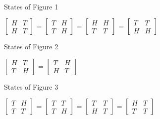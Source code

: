 \documentclass{article}
\begin{document}
\\
\begin{center}
States of Figure 1
\end{center}
\begin{center}
$\begin{bmatrix}
        H & T \\
        H & T 
    \end{bmatrix}$
        = 
    $\begin{bmatrix}
        T & H \\
        T & H 
    \end{bmatrix}$
       =
    $\begin{bmatrix}
        H & H \\
        T & T 
    \end{bmatrix}$
        =
    $\begin{bmatrix}
        T & T \\
        H & H 
    \end{bmatrix}$
\end{center}
\begin{center}
States of Figure 2
\end{center}
\begin{center}
$\begin{bmatrix} 
        H & T \\
        T & H
        \end{bmatrix}$
        =
        $\begin{bmatrix}
        T & H \\
        H & T 
        \end{bmatrix}$
\end{center}
\begin{center}
States of Figure 3
\end{center}
\begin{center}
$\begin{bmatrix} 
        T & H \\
        T & T
        \end{bmatrix}$
        =
        $\begin{bmatrix}
        T & T \\
        T & H 
        \end{bmatrix}$
         =
        $\begin{bmatrix}
        T & T \\
        H & T 
        \end{bmatrix}$
         =
        $\begin{bmatrix}
        H & T \\
        T & T 
        \end{bmatrix}$
\end{center}
\end{document}
